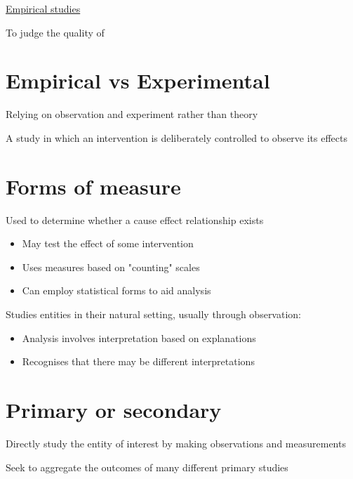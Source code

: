 \documentclass{article}[18pt]
\begin{document}
\begin{center}
\underline{\huge Empirical studies}
\end{center}
\begin{definition}[Evaluate]
	To judge the quality of
\end{definition}
\section{Empirical vs Experimental}
\begin{definition}[Empirical]
Relying on observation and experiment rather than theory
\end{definition}
\begin{definition}[Experiment]
A study in which an intervention is deliberately controlled to observe its effects
\end{definition}
\section{Forms of measure}
\begin{definition}
Used to determine whether a cause effect relationship exists
\begin{itemize}
	\item May test the effect of some intervention
	\item Uses measures based on "counting" scales
	\item Can employ statistical forms to aid analysis
\end{itemize}
\end{definition}
\begin{definition}
Studies entities in their natural setting, usually through observation:
\begin{itemize}
	\item Analysis involves interpretation based on explanations
	\item Recognises that there may be different interpretations
\end{itemize}
\end{definition}
\section{Primary or secondary}
\begin{definition}
Directly study the entity of interest by making observations and measurements
\end{definition}
\begin{definition}
Seek to aggregate the outcomes of many different primary studies
\end{definition}
\end{document}
